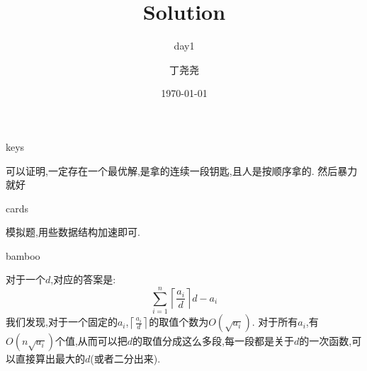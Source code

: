 \documentclass[11pt,serif]{beamer}
\begin{document}
	\author{丁尧尧}
	\title{Solution}
	\subtitle{day1}
	\date{\today}
	
	\begin{frame}[plain]
		\maketitle
	\end{frame}

	\begin{frame}{keys}
		\begin{solution}
			可以证明,一定存在一个最优解,是拿的连续一段钥匙,且人是按顺序拿的. 然后暴力就好
		\end{solution}
	\end{frame}

	\begin{frame}{cards} 
		\begin{solution}
			模拟题,用些数据结构加速即可.
		\end{solution}	
	\end{frame}

	\begin{frame}{bamboo}
		\begin{solution}
			对于一个$d$,对应的答案是:
			$$
				\sum_{i = 1}^{n}\left\lceil \frac{a_i}{d} \right\rceil d - a_i
			$$
			我们发现,对于一个固定的$a_i$,$\left\lceil \frac{a_i}{d} \right\rceil$的取值个数为$O(\sqrt{a_i})$. 对于所有$a_i$,有$O(n\sqrt{a_i})$个值,从而可以把$d$的取值分成这么多段,每一段都是关于$d$的一次函数,可以直接算出最大的$d$(或者二分出来).
		\end{solution}
	\end{frame} 
\end{document}
